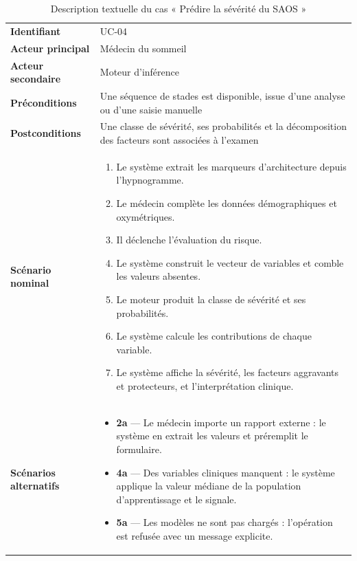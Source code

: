 \begin{table}[H]
\centering
\caption{Description textuelle du cas « Prédire la sévérité du SAOS »}
\label{tab:desc-osa}
\small
\begin{tabular}{@{}L{3.0cm}L{11.4cm}@{}}
\toprule
\textbf{Identifiant} & UC-04 \\
\textbf{Acteur principal} & Médecin du sommeil \\
\textbf{Acteur secondaire} & Moteur d'inférence \\
\textbf{Préconditions} & Une séquence de stades est disponible, issue d'une analyse ou
d'une saisie manuelle \\
\textbf{Postconditions} & Une classe de sévérité, ses probabilités et la décomposition
des facteurs sont associées à l'examen \\
\midrule
\textbf{Scénario nominal} &
\begin{minipage}[t]{11.2cm}
\begin{enumerate}[leftmargin=1.1em,itemsep=1pt,topsep=2pt]
  \item Le système extrait les marqueurs d'architecture depuis l'hypnogramme.
  \item Le médecin complète les données démographiques et oxymétriques.
  \item Il déclenche l'évaluation du risque.
  \item Le système construit le vecteur de variables et comble les valeurs absentes.
  \item Le moteur produit la classe de sévérité et ses probabilités.
  \item Le système calcule les contributions de chaque variable.
  \item Le système affiche la sévérité, les facteurs aggravants et protecteurs, et
        l'interprétation clinique.
\end{enumerate}
\end{minipage} \\
\midrule
\textbf{Scénarios alternatifs} &
\begin{minipage}[t]{11.2cm}
\begin{itemize}[leftmargin=1.1em,itemsep=1pt,topsep=2pt]
  \item \textbf{2a} --- Le médecin importe un rapport externe : le système en extrait
        les valeurs et préremplit le formulaire.
  \item \textbf{4a} --- Des variables cliniques manquent : le système applique la
        valeur médiane de la population d'apprentissage et le signale.
  \item \textbf{5a} --- Les modèles ne sont pas chargés : l'opération est refusée avec
        un message explicite.
\end{itemize}
\end{minipage} \\
\bottomrule
\end{tabular}
\end{table}

